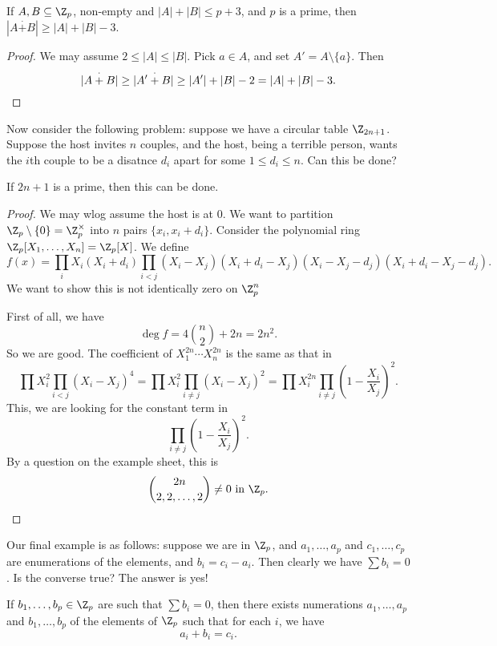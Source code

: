 \documentclass[a4paper]{article}
\begin{document}
\begin{cor}
  If $A, B \subseteq \Z_p$, non-empty and $|A| + |B| \leq p + 3$, and $p$ is a prime, then $|A \overset{\cdot}{+} B| \geq |A| + |B| - 3$.
\end{cor}

\begin{proof}
  We may assume $2 \leq |A| \leq |B|$. Pick $a \in A$, and set $A' = A \setminus \{a\}$. Then
  \[
    |A \overset{\cdot}{+} B| \geq |A' \overset{\cdot}{+} B| \geq |A'| + |B| - 2 = |A| + |B| - 3.\qedhere
  \]
\end{proof}

Now consider the following problem: suppose we have a circular table $\Z_{2n + 1}$. Suppose the host invites $n$ couples, and the host, being a terrible person, wants the $i$th couple to be a disatnce $d_i$ apart for some $1 \leq d_i \leq n$. Can this be done?

\begin{thm}
  If $2n + 1$ is a prime, then this can be done.
\end{thm}

\begin{proof}
  We may wlog assume the host is at $0$. We want to partition $\Z_p \setminus \{0\} = \Z_p^\times$ into $n$ pairs $\{x_i, x_i + d_i\}$. Consider the polynomial ring $\Z_p[X_1, \ldots, X_n] = \Z_p[X]$. We define
  \[
    f(x) = \prod_i X_i (X_i + d_i) \prod_{i < j} (X_i - X_j)(X_i + d_i - X_j) (X_i - X_j - d_j)(X_i + d_i - X_j - d_j).
  \]
  We want to show this is not identically zero on $\Z_p^n$

  First of all, we have
  \[
    \deg f = 4 \binom{n}{2} + 2n = 2n^2.
  \]
  So we are good. The coefficient of $X_1^{2n} \cdots X_n^{2n}$ is the same as that in
  \[
    \prod X_i^2 \prod_{i < j} (X_i - X_j)^4 = \prod X_i^2 \prod_{i \not= j} (X_i - X_j)^2 = \prod X_i^{2n} \prod_{i \not= j} \left(1 - \frac{X_i}{X_j}\right)^2.
  \]
  This, we are looking for the constant term in
  \[
    \prod_{i \not= j} \left(1 - \frac{X_i}{ X_j}\right)^2.
  \]
  By a question on the example sheet, this is
  \[
    \binom{2n}{2,2,\ldots, 2} \not= 0\text{ in }\Z_p.\qedhere
  \]
\end{proof}

Our final example is as follows: suppose we are in $\Z_p$, and $a_1, \ldots, a_p$ and $c_1, \ldots, c_p$ are enumerations of the elements, and $b_i = c_i - a_i$. Then clearly we have $\sum b_i = 0$. Is the converse true? The answer is yes!
\begin{thm}
  If $b_1, \ldots, b_p \in \Z_p$ are such that $\sum b_i = 0$, then there exists numerations $a_1, \ldots, a_p$ and $b_1, \ldots, b_p$ of the elements of $\Z_p$ such that for each $i$, we have
  \[
    a_i + b_i = c_i.
  \]
\end{thm}
\end{document}
